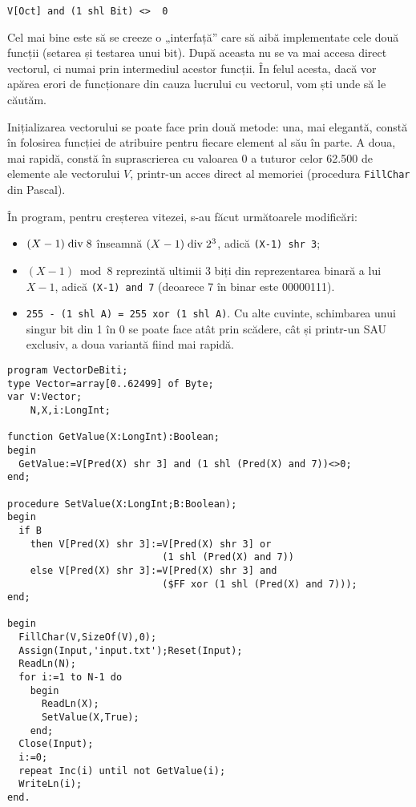 \begin{verbatim}
V[Oct] and (1 shl Bit) <>  0
\end{verbatim}

Cel mai bine este să se creeze o „interfață” care să aibă implementate cele
două funcții (setarea și testarea unui bit). După aceasta nu se va mai accesa
direct vectorul, ci numai prin intermediul acestor funcții. În felul acesta,
dacă vor apărea erori de funcționare din cauza lucrului cu vectorul, vom ști
unde să le căutăm.

Inițializarea vectorului se poate face prin două metode: una, mai elegantă,
constă în folosirea funcției de atribuire pentru fiecare element al său în
parte. A doua, mai rapidă, constă în suprascrierea cu valoarea 0 a tuturor
celor 62.500 de elemente ale vectorului $V$, printr-un acces direct al
memoriei (procedura {\tt FillChar} din Pascal).

În program, pentru creșterea vitezei, s-au făcut următoarele modificări:

\begin{itemize}

\item $(X-1) \bdiv 8$ înseamnă $(X-1) \bdiv 2^3$, adică {\tt (X-1) shr 3};

\item $(X-1) \bmod 8$ reprezintă ultimii 3 biți din reprezentarea binară a
  lui $X - 1$, adică {\tt (X-1) and 7} (deoarece 7 în binar este 00000111).

\item {\tt 255 - (1 shl A) = 255 xor (1 shl A)}. Cu alte cuvinte, schimbarea
  unui singur bit din 1 în 0 se poate face atât prin scădere, cât și printr-un
  SAU exclusiv, a doua variantă fiind mai rapidă.

\end{itemize}

\begin{verbatim}
program VectorDeBiti;
type Vector=array[0..62499] of Byte;
var V:Vector;
    N,X,i:LongInt;

function GetValue(X:LongInt):Boolean;
begin
  GetValue:=V[Pred(X) shr 3] and (1 shl (Pred(X) and 7))<>0;
end;

procedure SetValue(X:LongInt;B:Boolean);
begin
  if B
    then V[Pred(X) shr 3]:=V[Pred(X) shr 3] or
                           (1 shl (Pred(X) and 7))
    else V[Pred(X) shr 3]:=V[Pred(X) shr 3] and
                           ($FF xor (1 shl (Pred(X) and 7)));
end;

begin
  FillChar(V,SizeOf(V),0);
  Assign(Input,'input.txt');Reset(Input);
  ReadLn(N);
  for i:=1 to N-1 do
    begin
      ReadLn(X);
      SetValue(X,True);
    end;
  Close(Input);
  i:=0;
  repeat Inc(i) until not GetValue(i);
  WriteLn(i);
end.
\end{verbatim}


